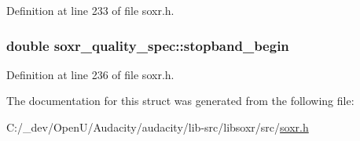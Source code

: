 Definition at line 233 of file soxr.\+h.

\subsubsection[{\texorpdfstring{stopband\+\_\+begin}{stopband_begin}}]{\setlength{\rightskip}{0pt plus 5cm}double soxr\+\_\+quality\+\_\+spec\+::stopband\+\_\+begin}\hypertarget{structsoxr__quality__spec_a87bce61f87f57da23f63d9634a89975e}{}\label{structsoxr__quality__spec_a87bce61f87f57da23f63d9634a89975e}


Definition at line 236 of file soxr.\+h.



The documentation for this struct was generated from the following file\+:\begin{DoxyCompactItemize}
\item 
C\+:/\+\_\+dev/\+Open\+U/\+Audacity/audacity/lib-\/src/libsoxr/src/\hyperlink{soxr_8h}{soxr.\+h}\end{DoxyCompactItemize}
